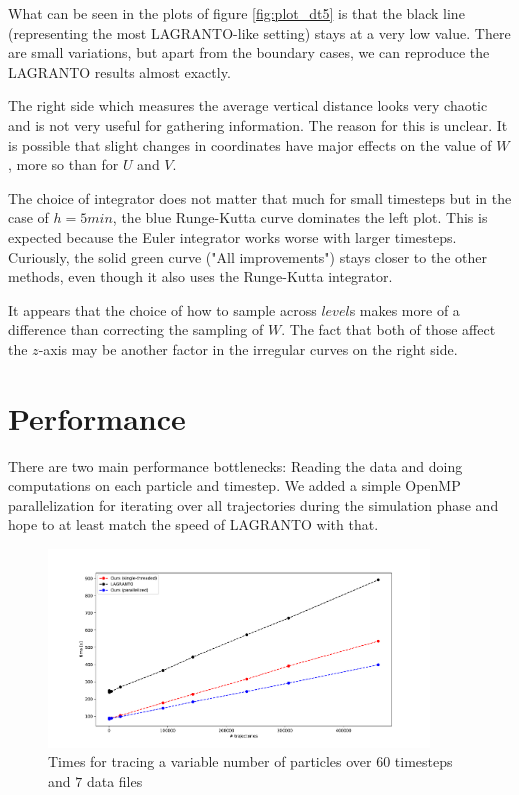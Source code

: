 What can be seen in the plots of figure \ref{fig:plot_dt5} is that the black line (representing the most LAGRANTO-like setting) stays at a very low value. There are small variations, but apart from the boundary cases, we can reproduce the LAGRANTO results almost exactly.

The right side which measures the average vertical distance looks very chaotic and is not very useful for gathering information. The reason for this is unclear. It is possible that slight changes in coordinates have major effects on the value of $W$, more so than for $U$ and $V$.

The choice of integrator does not matter that much for small timesteps but in the case of $h = 5 min$, the blue Runge-Kutta curve dominates the left plot. This is expected because the Euler integrator works worse with larger timesteps. Curiously, the solid green curve ("All improvements") stays closer to the other methods, even though it also uses the Runge-Kutta integrator.

It appears that the choice of how to sample across $level$s makes more of a difference than correcting the sampling of $W$. The fact that both of those affect the $z$-axis may be another factor in the irregular curves on the right side.

\section{Performance}

There are two main performance bottlenecks: Reading the data and doing computations on each particle and timestep. We added a simple OpenMP parallelization for iterating over all trajectories during the simulation phase and hope to at least match the speed of LAGRANTO with that.


\begin{figure}
\centering \includegraphics*[width=0.9\textwidth]{figures/plot_times}
\caption{Times for tracing a variable number of particles over $60$ timesteps and $7$ data files}
\label{fig:plot_time}
\end{figure}

